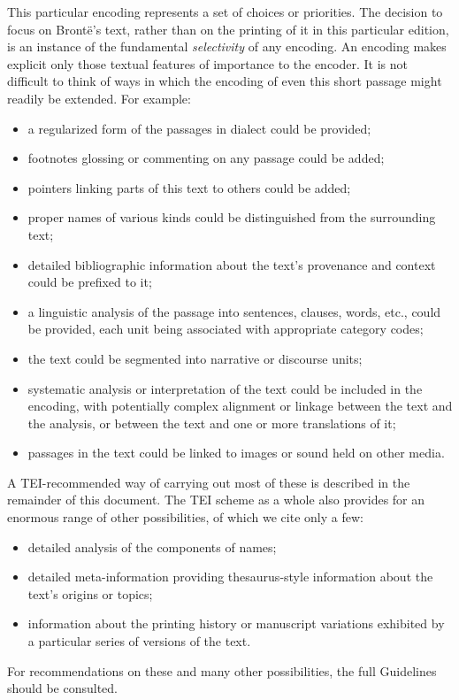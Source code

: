 \documentclass[11pt,twoside]{article}\makeatletter
\begin{document}
This particular encoding represents a set of choices or priorities. The decision to focus on Brontë's text, rather than on the printing of it in this particular edition, is an instance of the fundamental \textit{selectivity} of any encoding. An encoding makes explicit only those textual features of importance to the encoder.  It is not difficult to think of ways in which the encoding of even this short passage might readily be extended. For example: \begin{itemize}

\item a regularized form of the passages in dialect could be provided;
\item footnotes glossing or commenting on any passage could be added;
\item pointers linking parts of this text to others could be added;
\item proper names of various kinds could be distinguished from the surrounding text;
\item detailed bibliographic information about the text's provenance and context could be prefixed to it;
\item a linguistic analysis of the passage into sentences, clauses, words, etc., could be provided, each unit being associated with appropriate category codes;
\item the text could be segmented into narrative or discourse        units;
\item systematic analysis or interpretation of the text could be included in the encoding, with potentially complex alignment or linkage between the text and the analysis, or between the text and one or more translations of it;
\item passages in the text could be linked to images or sound held on other media.
\end{itemize} \par
A TEI-recommended way of carrying out most of these is described in the remainder of this document. The TEI scheme as a whole also provides for an enormous range of other possibilities, of which we cite only a few: \begin{itemize}

\item detailed analysis of the components of names;
\item detailed meta-information providing thesaurus-style information about the text's origins or topics;
\item information about the printing history or manuscript variations exhibited by a particular series of versions of the text.
\end{itemize}  For recommendations on these and many other possibilities, the full Guidelines should be consulted.
\end{document}

